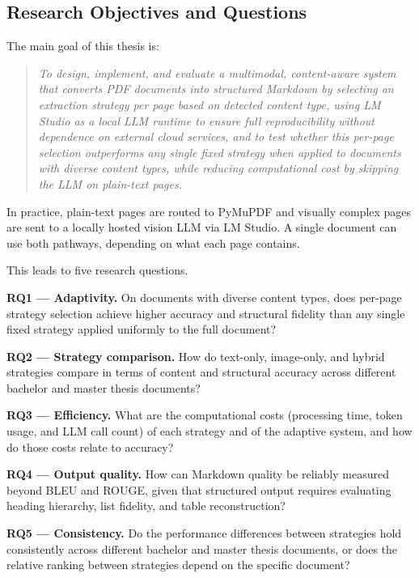 \documentclass[12pt]{article}
\begin{document}
\subsection{Research Objectives and Questions}

The main goal of this thesis is:

\begin{quote}
\textit{To design, implement, and evaluate a multimodal, content-aware system
that converts PDF documents into structured Markdown by selecting an extraction
strategy per page based on detected content type, using LM Studio as a local
LLM runtime to ensure full reproducibility without dependence on external cloud
services, and to test whether this per-page selection outperforms any single
fixed strategy when applied to documents with diverse content types, while
reducing computational cost by skipping the LLM on plain-text pages.}
\end{quote}

In practice, plain-text pages are routed to PyMuPDF and visually complex pages
are sent to a locally hosted vision LLM via LM Studio. A single document can
use both pathways, depending on what each page contains.

This leads to five research questions.

\textbf{RQ1 --- Adaptivity.} On documents with diverse content types, does
per-page strategy selection achieve higher accuracy and structural fidelity
than any single fixed strategy applied uniformly to the full document?

\textbf{RQ2 --- Strategy comparison.} How do text-only, image-only, and hybrid
strategies compare in terms of content and structural accuracy across different
bachelor and master thesis documents?

\textbf{RQ3 --- Efficiency.} What are the computational costs (processing time,
token usage, and LLM call count) of each strategy and of the adaptive system,
and how do those costs relate to accuracy?

\textbf{RQ4 --- Output quality.} How can Markdown quality be reliably measured
beyond BLEU and ROUGE, given that structured output requires evaluating heading
hierarchy, list fidelity, and table reconstruction?

\textbf{RQ5 --- Consistency.} Do the performance differences between strategies
hold consistently across different bachelor and master thesis documents, or does
the relative ranking between strategies depend on the specific document?
\end{document}

